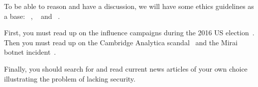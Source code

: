 To be able to reason and have a discussion, we will have some ethics guidelines 
as a base:
~\cite{acmcode},
~\cite{acmsecode} and
~\cite{ieeecode}.

First, you must read up on the influence campaigns during the 2016 US 
election~\cite{inside-russian-influence-campaign}.
Then you must read up on the Cambridge Analytica scandal~\cite[\eg][]{%
  wired-cambridge-analytica,
  guardian-cambridge-analytica,
  nytimes-cambridge-analytica,
  wp-cambridge-analytica,
} and the Mirai botnet incident~\cite{schneier-mirai}.

Finally, you should search for and read current news articles of your own 
choice illustrating the problem of lacking security.
